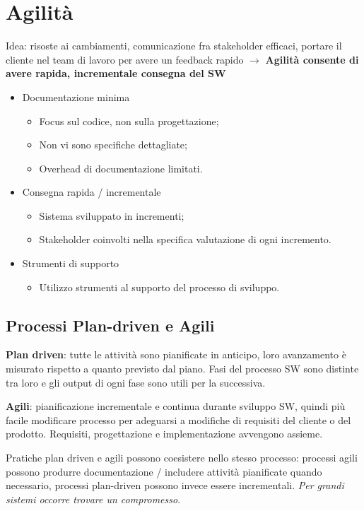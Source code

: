 \documentclass{article}
\begin{document}
  \section{Agilità}
    Idea: risoste ai cambiamenti, comunicazione fra stakeholder efficaci, portare il cliente nel team di lavoro per avere un feedback rapido $\rightarrow$ \textbf{Agilità consente di avere rapida, incrementale consegna del SW}
    \begin{itemize}
      \item Documentazione minima
        \begin{itemize}
          \item Focus sul codice, non sulla progettazione;
          \item Non vi sono specifiche dettagliate;
          \item Overhead di documentazione limitati. 
        \end{itemize}
      \item Consegna rapida / incrementale
        \begin{itemize}
          \item Sistema sviluppato in incrementi;
          \item Stakeholder coinvolti nella specifica valutazione di ogni incremento.
        \end{itemize}
      \item Strumenti di supporto
        \begin{itemize}
          \item Utilizzo strumenti al supporto del processo di sviluppo.
        \end{itemize}
    \end{itemize}
    \subsection{Processi Plan-driven e Agili}
      \begin{minipage}[t]{0.48\textwidth}
        \textbf{Plan driven}: tutte le attività sono pianificate in anticipo, loro avanzamento è misurato rispetto a quanto previsto dal piano. Fasi del processo SW sono distinte tra loro e gli output di ogni fase sono utili per la successiva.
      \end{minipage}
      \hfill
      \begin{minipage}[t]{0.48\textwidth}
        \textbf{Agili}: pianificazione incrementale e continua durante sviluppo SW, quindi più facile modificare processo per adeguarsi a modifiche di requisiti del cliente o del prodotto. Requisiti, progettazione e implementazione avvengono assieme.
      \end{minipage}
      Pratiche plan driven e agili possono coesistere nello stesso processo: processi agili possono produrre documentazione / includere attività pianificate quando necessario, processi plan-driven possono invece essere incrementali. \textit{Per grandi sistemi occorre trovare un compromesso}. 
\end{document}
